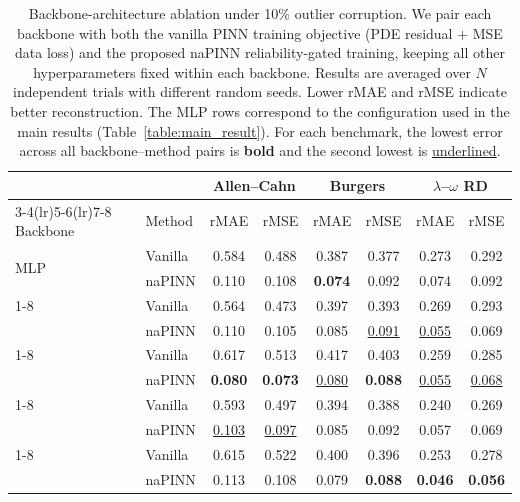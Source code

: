 \documentclass{article}
\theoremstyle{plain}
\theoremstyle{definition}
\theoremstyle{remark}
\begin{document}
\begin{sc}
\begin{table}[t]
\centering
\small
\caption{Backbone-architecture ablation under 10\% outlier corruption.
We pair each backbone with both the vanilla PINN training objective
(PDE residual + MSE data loss) and the proposed naPINN reliability-gated
training, keeping all other hyperparameters fixed within each backbone.
Results are averaged over $N$ independent trials with different random seeds.
Lower rMAE and rMSE indicate better reconstruction.
The MLP rows correspond to the configuration used in the main results
(Table~\ref{table:main_result}).
For each benchmark, the lowest error across all backbone--method pairs is
\textbf{bold} and the second lowest is \underline{underlined}.}
\label{tab:backbone_comparison}
\setlength{\tabcolsep}{4pt}
\begin{tabular}{llcccccc}
\toprule
& & \multicolumn{2}{c}{Allen--Cahn} & \multicolumn{2}{c}{Burgers} & \multicolumn{2}{c}{$\lambda$--$\omega$ RD} \\
\cmidrule(lr){3-4}\cmidrule(lr){5-6}\cmidrule(lr){7-8}
Backbone & Method & rMAE & rMSE & rMAE & rMSE & rMAE & rMSE \\
\midrule

\multirow{2}{*}{MLP}
 & Vanilla & 0.584 & 0.488 & 0.387 & 0.377 & 0.273 & 0.292 \\
 & naPINN  & 0.110 & 0.108 & \textbf{0.074} & 0.092 & 0.074 & 0.092 \\
\cmidrule(lr){1-8}

\multirow{2}{*}{KAN~\cite{Liu2024KAN}}
 & Vanilla & 0.564 & 0.473 & 0.397 & 0.393 & 0.269 & 0.293 \\
 & naPINN  & 0.110 & 0.105 & 0.085 & \underline{0.091} & \underline{0.055} & 0.069 \\
\cmidrule(lr){1-8}

\multirow{2}{*}{FLS~\cite{Wong2022FLS}}
 & Vanilla & 0.617 & 0.513 & 0.417 & 0.403 & 0.259 & 0.285 \\
 & naPINN  & \textbf{0.080} & \textbf{0.073} & \underline{0.080} & \textbf{0.088} & \underline{0.055} & \underline{0.068} \\
\cmidrule(lr){1-8}

\multirow{2}{*}{QRes~\cite{Bu2021QRes}}
 & Vanilla & 0.593 & 0.497 & 0.394 & 0.388 & 0.240 & 0.269 \\
 & naPINN  & \underline{0.103} & \underline{0.097} & 0.085 & 0.092 & 0.057 & 0.069 \\
\cmidrule(lr){1-8}

\multirow{2}{*}{PirateNet~\cite{Wang2024PirateNet}}
 & Vanilla & 0.615 & 0.522 & 0.400 & 0.396 & 0.253 & 0.278 \\
 & naPINN  & 0.113 & 0.108 & 0.079 & \textbf{0.088} & \textbf{0.046} & \textbf{0.056} \\

\bottomrule
\end{tabular}
\end{table}
\end{sc}
\end{document}
